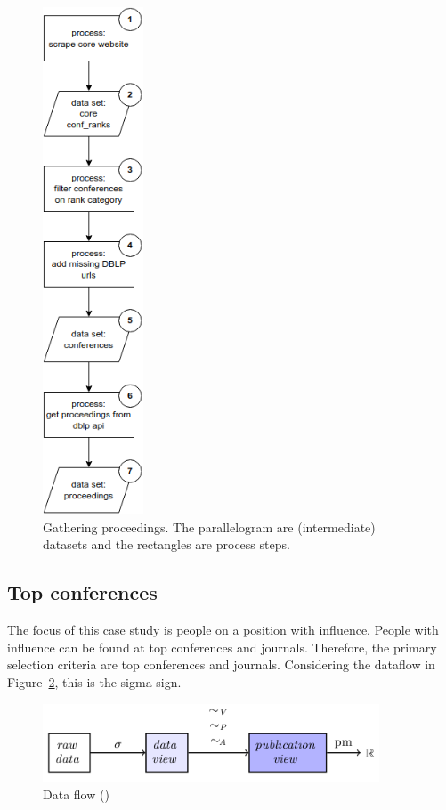 \documentclass{ou-report}
\begin{document}
\begin{figure}[H]
    \centering
    \includegraphics[width=3cm]{images/data_integration/core_dblp_api.png}
    \caption{Gathering proceedings. The parallelogram are 
    (intermediate) datasets and the rectangles are process steps.}
    \label{fig:data_integration_core_dblp_api}
\end{figure}

\subsection{Top conferences}
The focus of this case study is people on a position with influence.
People with influence can be found at top conferences and journals.
Therefore, the primary selection criteria are top conferences and journals.
Considering the dataflow in Figure~\ref{fig:dataflow_jm2017_2}, this is the 
sigma-sign.

\begin{figure}[H]
    \centering
    \includegraphics[width=10cm]{images/data_to_publication_metrics_jm2017.png}
    \caption{Data flow (\cite{JM2017})}
    \label{fig:dataflow_jm2017_2}
\end{figure}
\end{document}

